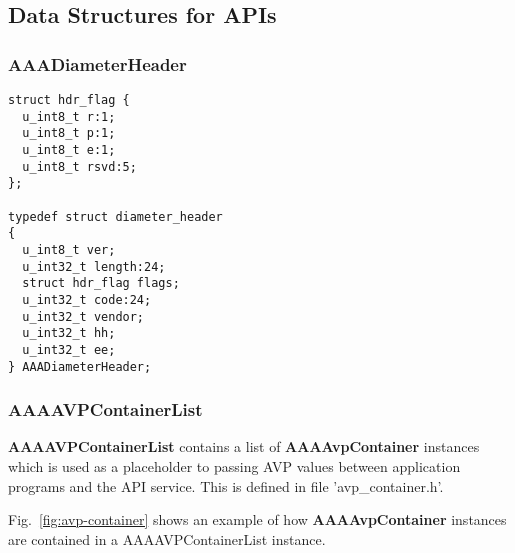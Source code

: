 \subsection{Data Structures for APIs}

\subsubsection{AAADiameterHeader}

\begin{verbatim}
struct hdr_flag {
  u_int8_t r:1;
  u_int8_t p:1;
  u_int8_t e:1;
  u_int8_t rsvd:5;
};

typedef struct diameter_header
{
  u_int8_t ver;
  u_int32_t length:24;
  struct hdr_flag flags;
  u_int32_t code:24;
  u_int32_t vendor;
  u_int32_t hh;
  u_int32_t ee;
} AAADiameterHeader;
\end{verbatim}

\subsubsection{AAAAVPContainerList}

{\bf AAAAVPContainerList} contains a list of {\bf AAAAvpContainer}
instances which is used as a placeholder to passing AVP values between
application programs and the API service.  This is defined in file
'avp\_container.h'.

Fig.~\ref{fig:avp-container} shows an example of how
{\bf AAAAvpContainer} instances are contained in a {AAAAVPContainerList}
instance.

